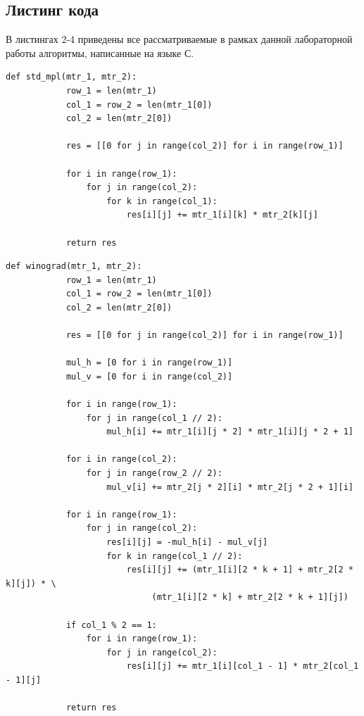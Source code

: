 \documentclass[a4paper, 14pt]{article}
\begin{document}
        \subsection{Листинг кода}
        В листингах 2-4 приведены все рассматриваемые в рамках данной лабораторной работы алгоритмы, написанные на языке С.
        \newpage
		\begin{lstlisting}[label=some-code,caption=Стандартный алгоритм]
		def std_mpl(mtr_1, mtr_2):
    		row_1 = len(mtr_1)
    		col_1 = row_2 = len(mtr_1[0])
    		col_2 = len(mtr_2[0])

    		res = [[0 for j in range(col_2)] for i in range(row_1)]

    		for i in range(row_1):
        		for j in range(col_2):
            		for k in range(col_1):
                		res[i][j] += mtr_1[i][k] * mtr_2[k][j]

    		return res
		\end{lstlisting}
		\begin{lstlisting}[label=some-code,caption=Алгоритм Винограда]
		def winograd(mtr_1, mtr_2):
    		row_1 = len(mtr_1)
    		col_1 = row_2 = len(mtr_1[0])
    		col_2 = len(mtr_2[0])

    		res = [[0 for j in range(col_2)] for i in range(row_1)]

    		mul_h = [0 for i in range(row_1)]
    		mul_v = [0 for i in range(col_2)]

    		for i in range(row_1):
        		for j in range(col_1 // 2):
            		mul_h[i] += mtr_1[i][j * 2] * mtr_1[i][j * 2 + 1]

    		for i in range(col_2):
        		for j in range(row_2 // 2):
            		mul_v[i] += mtr_2[j * 2][i] * mtr_2[j * 2 + 1][i]

    		for i in range(row_1):
        		for j in range(col_2):
            		res[i][j] = -mul_h[i] - mul_v[j]
            		for k in range(col_1 // 2):
                		res[i][j] += (mtr_1[i][2 * k + 1] + mtr_2[2 * k][j]) * \
                             (mtr_1[i][2 * k] + mtr_2[2 * k + 1][j])

    		if col_1 % 2 == 1:
        		for i in range(row_1):
            		for j in range(col_2):
                		res[i][j] += mtr_1[i][col_1 - 1] * mtr_2[col_1 - 1][j]

    		return res
		\end{lstlisting}
		\newpage
\end{document}
